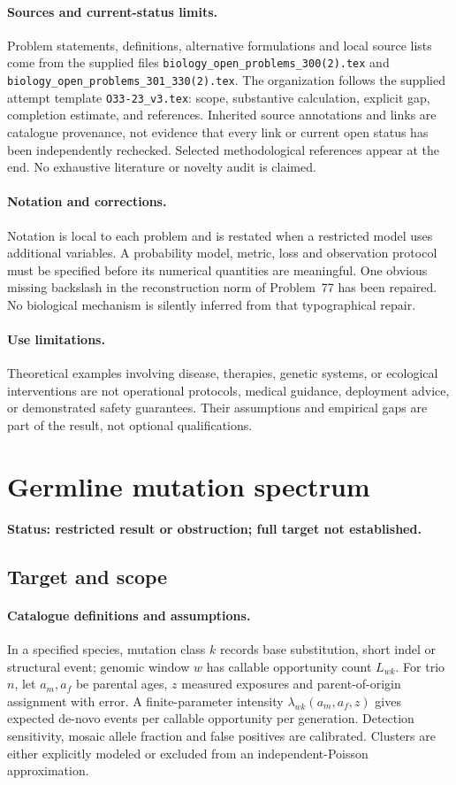 \documentclass[11pt]{article}
\begin{document}
\paragraph{Sources and current-status limits.}
Problem statements, definitions, alternative formulations and local source lists
come from the supplied files
\texttt{biology\_open\_problems\_300(2).tex} and
\texttt{biology\_open\_problems\_301\_330(2).tex}.
The organization follows the supplied attempt template
\texttt{O33-23\_v3.tex}: scope, substantive calculation, explicit gap,
completion estimate, and references. Inherited source annotations and links are
catalogue provenance, not evidence that every link or current open status has
been independently rechecked. Selected methodological references appear at the
end. No exhaustive literature or novelty audit is claimed.

\paragraph{Notation and corrections.}
Notation is local to each problem and is restated when a restricted model uses
additional variables. A probability model, metric, loss and observation protocol
must be specified before its numerical quantities are meaningful. One obvious
missing backslash in the reconstruction norm of Problem~77 has been repaired.
No biological mechanism is silently inferred from that typographical repair.

\paragraph{Use limitations.}
Theoretical examples involving disease, therapies, genetic systems, or ecological
interventions are not operational protocols, medical guidance, deployment advice,
or demonstrated safety guarantees. Their assumptions and empirical gaps are part
of the result, not optional qualifications.


\section*{Germline mutation spectrum}
\label{prob:031}
\noindent\textbf{Status: restricted result or obstruction; full target not established.}
\subsection{Target and scope}
\paragraph{Catalogue definitions and assumptions.}
In a specified species, mutation class $k$ records base substitution, short indel or structural event; genomic window $w$ has callable opportunity count $L_{wk}$. For trio $n$, let $a_m,a_f$ be parental ages, $z$ measured exposures and parent-of-origin assignment with error. A finite-parameter intensity $\lambda_{wk}(a_m,a_f,z)$ gives expected de-novo events per callable opportunity per generation. Detection sensitivity, mosaic allele fraction and false positives are calibrated. Clusters are either explicitly modeled or excluded from an independent-Poisson approximation.
\end{document}
